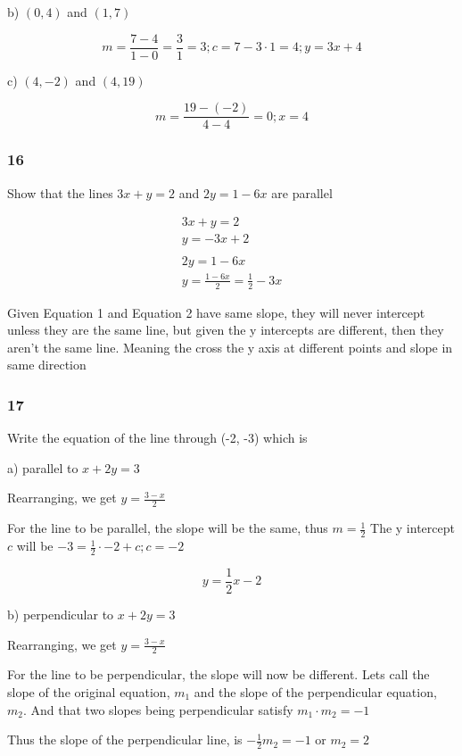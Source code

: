 \documentclass[]{report}
\begin{document}
b) $(0, 4)$ and $(1, 7)$

\[
m = \frac{7 - 4}{1 - 0} = \frac{3}{1} = 3; c = 7 - 3\cdot 1 = 4; y = 3x + 4
\]

c) $(4, -2)$ and $(4, 19)$

\[
m = \frac{19 - (-2)}{4 - 4} = 0; x = 4
\]


\subsubsection{16}

Show that the lines $3x + y = 2$ and $2y = 1- 6x$ are parallel

\begin{align*}
3x + y = 2 \tag{Equation 1}\\
y = -3x + 2 \tag{when rearranged}\\
\\
2y = 1 - 6x \tag{Equation 2}	\\
y = \frac{1 - 6x}{2} = \frac{1}{2} - 3x \tag{when rearranged}
\end{align*}

Given Equation 1 and Equation 2 have same slope, they will never intercept unless they are the same line, but given the y intercepts are different, then they aren't the same line. Meaning the cross the y axis at different points and slope in same direction


\subsubsection{17}

Write the equation of the line through (-2, -3) which is 

a) parallel to $x + 2y = 3$

Rearranging, we get $y = \frac{3 - x}{2}$

For the line to be parallel, the slope will be the same, thus $m=\frac{1}{2}$ The y intercept $c$ will be $-3 = \frac{1}{2}\cdot -2 + c; c=-2$

\[
	y = \frac{1}{2}x -2
\]

b) perpendicular to $x + 2y = 3$

Rearranging, we get $y = \frac{3 - x}{2}$

For the line to be perpendicular, the slope will now be different. Lets call the slope of the original equation, $m_1$ and the slope of the perpendicular equation, $m_2$. And that two slopes being perpendicular satisfy $m_1\cdot m_2 = -1$

Thus the slope of the perpendicular line, is $-\frac{1}{2}m_2 = -1$ or $m_2 = 2$
\end{document}

